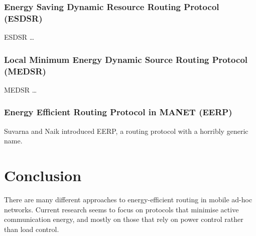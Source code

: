 \documentclass[conference]{IEEEtran}
\begin{document}
\subsubsection{Energy Saving Dynamic Resource Routing Protocol (ESDSR)}
ESDSR\cite{tarique2005energy} \ldots
\subsubsection{Local Minimum Energy Dynamic Source Routing Protocol (MEDSR)}
MEDSR\cite{tanque2007minimum} \ldots

\subsubsection{Energy Efficient Routing Protocol in MANET (EERP)}
Suvarna and Naik introduced EERP, a routing protocol with a horribly
generic name\cite{main2}.

\section{Conclusion}
There are many different approaches to energy-efficient routing in
mobile ad-hoc networks. Current research seems to focus on protocols
that minimise active communication energy, and mostly on those that
rely on power control rather than load control.




\end{document}

